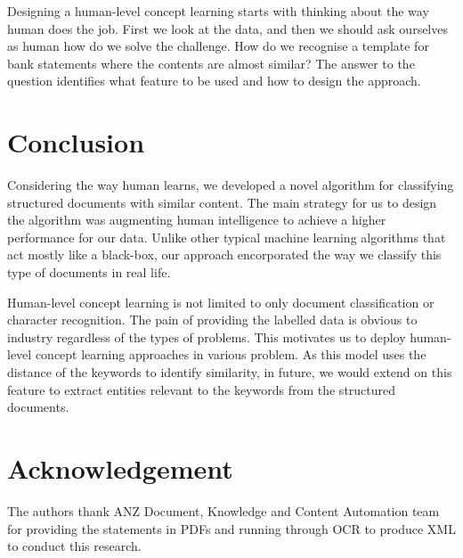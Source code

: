 Designing a human-level concept learning starts with thinking about the way human does the job. First we look at the data, and then we should ask ourselves as human how do we solve the challenge. How do we recognise a template for bank statements where the contents are almost similar? The answer to the question identifies what feature to be used and how to design the approach.

\section{Conclusion}\label{conc}
Considering the way human learns, we developed a novel algorithm for classifying structured documents with similar content. The main strategy for us to design the algorithm was augmenting human intelligence to achieve a higher performance for our data. Unlike other typical machine learning algorithms that act mostly like a black-box, our approach encorporated the way we classify this type of documents in real life.

Human-level concept learning is not limited to only document classification or character recognition. The pain of providing the labelled data is obvious to industry regardless of the types of problems. This motivates us to deploy human-level concept learning approaches in various problem. As this model uses the distance of the keywords to identify similarity, in future, we would extend on this feature to extract entities relevant to the keywords from the structured documents.

\section*{Acknowledgement}
The authors thank ANZ Document, Knowledge and Content Automation team for providing the statements in PDFs and running through OCR to produce XML to conduct this research.

